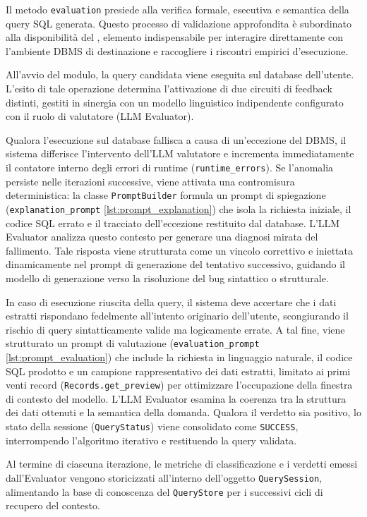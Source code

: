 Il metodo \texttt{evaluation} presiede alla verifica formale, esecutiva
e semantica della query SQL generata. Questo processo di validazione
approfondita è subordinato alla disponibilità del
, elemento indispensabile per interagire
direttamente con l'ambiente DBMS di destinazione e raccogliere i
riscontri empirici d'esecuzione.

All'avvio del modulo, la query candidata viene eseguita sul database
dell'utente. L'esito di tale operazione determina l'attivazione di due
circuiti di feedback distinti, gestiti in sinergia con un modello
linguistico indipendente configurato con il ruolo di valutatore
(LLM Evaluator).

Qualora l'esecuzione sul database fallisca a causa di un'eccezione del
DBMS, il sistema differisce l'intervento dell'LLM valutatore e
incrementa immediatamente il contatore interno degli errori di runtime
(\texttt{runtime\_errors}). Se l'anomalia persiste nelle iterazioni
successive, viene attivata una contromisura deterministica: la classe
\texttt{PromptBuilder} formula un prompt di spiegazione
(\texttt{explanation\_prompt} \ref{lst:prompt_explanation}) che isola la richiesta iniziale, il
codice SQL errato e il tracciato dell'eccezione restituito dal database.
L'LLM Evaluator analizza questo contesto per generare una diagnosi
mirata del fallimento. Tale risposta viene strutturata come un vincolo
correttivo e iniettata dinamicamente nel prompt di generazione del
tentativo successivo, guidando il modello di generazione verso la
risoluzione del bug sintattico o strutturale.

In caso di esecuzione riuscita della query, il sistema deve accertare
che i dati estratti rispondano fedelmente all'intento originario
dell'utente, scongiurando il rischio di query sintatticamente valide ma
logicamente errate. A tal fine, viene strutturato un prompt di
valutazione (\texttt{evaluation\_prompt} \ref{lst:prompt_evaluation}) che include la richiesta in
linguaggio naturale, il codice SQL prodotto e un campione
rappresentativo dei dati estratti, limitato ai primi venti record
(\texttt{Records.get\_preview}) per ottimizzare l'occupazione della
finestra di contesto del modello. L'LLM Evaluator esamina la coerenza
tra la struttura dei dati ottenuti e la semantica della domanda. Qualora
il verdetto sia positivo, lo stato della sessione (\texttt{QueryStatus})
viene consolidato come \texttt{SUCCESS}, interrompendo l'algoritmo
iterativo e restituendo la query validata.

Al termine di ciascuna iterazione, le metriche di classificazione e i
verdetti emessi dall'Evaluator vengono storicizzati all'interno
dell'oggetto \texttt{QuerySession}, alimentando la base di conoscenza
del \texttt{QueryStore} per i successivi cicli di recupero del contesto.

